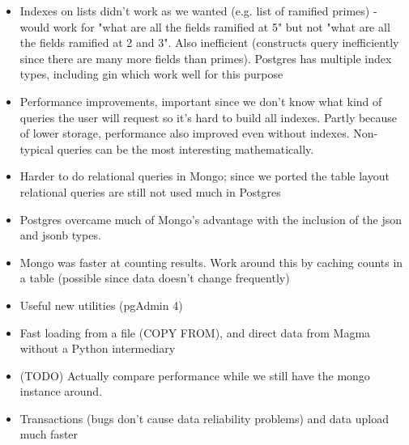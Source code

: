 \documentclass{article}
\begin{document}
\begin{itemize}
\item Indexes on lists didn't work as we wanted (e.g. list of ramified primes) - would work for "what are all the fields ramified at 5" but not "what are all the fields ramified at 2 and 3".  Also inefficient (constructs query inefficiently since there are many more fields than primes).  Postgres has multiple index types, including gin which work well for this purpose
\item Performance improvements, important since we don't know what kind of queries the user will request so it's hard to build all indexes.  Partly because of lower storage, performance also improved even without indexes.  Non-typical queries can be the most interesting mathematically.
\item Harder to do relational queries in Mongo; since we ported the table layout relational queries are still not used much in Postgres
\item Postgres overcame much of Mongo's advantage with the inclusion of the json and jsonb types.
\item Mongo was faster at counting results.  Work around this by caching counts in a table (possible since data doesn't change frequently)
\item Useful new utilities (pgAdmin 4)
\item Fast loading from a file (COPY FROM), and direct data from Magma without a Python intermediary
\item (TODO) Actually compare performance while we still have the mongo instance around.
\item Transactions (bugs don't cause data reliability problems) and data upload much faster
\end{itemize}
\end{document}
